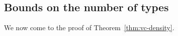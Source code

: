 \subsection{Bounds on the number of types}%



We now come to the proof of Theorem~\ref{thm:vc-density}.
%
%
%
